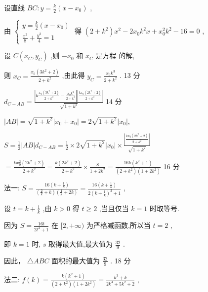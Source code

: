 \documentclass[10pt]{article}
\newcommand*\circled[1]{\tikz[baseline=(char.base)]{\node[shape=circle,draw,inner sep=1.5pt] (char) {\small #1};}}
\begin{document}
设直线 \({BC} : y = \frac{k}{2}\left( {x - {x}_{0}}\right)\) ,

由 \(\left\{  \begin{array}{l} y = \frac{k}{2}\left( {x - {x}_{0}}\right) \\  \frac{{x}^{2}}{8} + \frac{{y}^{2}}{4} = 1 \end{array}\right.\) 得 \(\left( {2 + {k}^{2}}\right) {x}^{2} - 2{x}_{0}{k}^{2}x + {x}_{0}^{2}{k}^{2} - {16} = 0\)  \circled{1} ,

设 \(C\left( {{x}_{C},{y}_{C}}\right)\) ,则 \(- {x}_{0}\) 和 \({x}_{C}\) 是方程 \circled{1} 的解,

则 \({x}_{C} = \frac{{x}_{0}\left( {3{k}^{2} + 2}\right) }{2 + {k}^{2}}\) ,由此得 \({y}_{C} = \frac{{x}_{0}{k}^{3}}{2 + {k}^{2}}\) . 13 分

\({d}_{C - {AB}} = \frac{\left| {k\frac{{x}_{0}\left( {3{k}^{2} + 2}\right) }{2 + {k}^{2}} - \frac{{x}_{0}{k}^{3}}{2 + {k}^{2}}}\right| \left| \frac{k{x}_{0}\left( {2{k}^{2} + 2}\right) }{2 + {k}^{2}}\right| }{\sqrt{1 + {k}^{2}}}\) 14 分

\(\left| {AB}\right|  = \sqrt{1 + {k}^{2}}\left| {{x}_{0} + {x}_{0}}\right|  = 2\sqrt{1 + {k}^{2}}\left| {x}_{0}\right| ,\)

\(S = \frac{1}{2}\left| {AB}\right| {d}_{C - {AB}} = \frac{1}{2} \times  2\sqrt{1 + {k}^{2}}\left| {x}_{0}\right|  \times  \frac{\left| \frac{k{x}_{0}\left( {2{k}^{2} + 2}\right) }{2 + {k}^{2}}\right| }{\sqrt{1 + {k}^{2}}}\)

\(= \frac{k{x}_{0}^{2}\left( {2{k}^{2} + 2}\right) }{2 + {k}^{2}} = \frac{k\left( {2{k}^{2} + 2}\right) }{2 + {k}^{2}} \times  \frac{8}{1 + 2{k}^{2}} = \frac{{16k}\left( {{k}^{2} + 1}\right) }{\left( {2 + {k}^{2}}\right) \left( {1 + 2{k}^{2}}\right) }\) 16 分

法一: \(S = \frac{{16}\left( {k + \frac{1}{k}}\right) }{\left( {\frac{2}{k} + k}\right) \left( {\frac{1}{k} + {2k}}\right) } = \frac{{16}\left( {k + \frac{1}{k}}\right) }{2{\left( k + \frac{1}{k}\right) }^{2} + 1}\) ,

设 \(t = k + \frac{1}{k}\) ,由 \(k > 0\) 得 \(t \geq  2\) ,当且仅当 \(k = 1\) 时取等号.

因为 \(S = \frac{16t}{2{t}^{2} + 1}\) 在 \(\lbrack 2, + \infty )\) 为严格减函数,所以当 \(t = 2\) ,

即 \(k = 1\) 时, \(s\) 取得最大值,最大值为 \(\frac{32}{9}\) .

因此， \(\bigtriangleup {ABC}\) 面积的最大值为 \(\frac{32}{9}\) . 18 分

法二: \(f\left( k\right)  = \frac{k\left( {{k}^{2} + 1}\right) }{\left( {2 + {k}^{2}}\right) \left( {1 + 2{k}^{2}}\right) } = \frac{{k}^{3} + k}{2{k}^{4} + 5{k}^{2} + 2}\) ,
\end{document}
